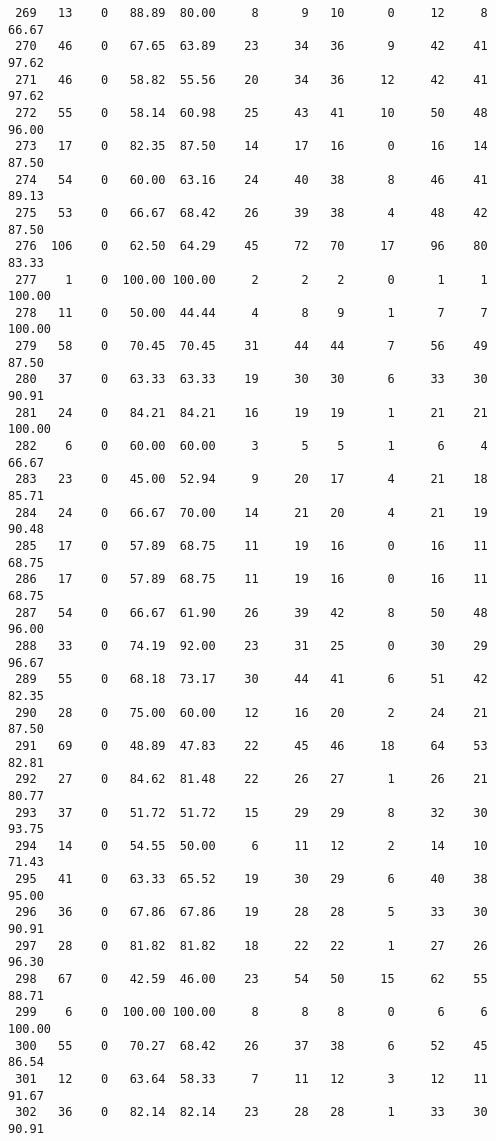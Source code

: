 \begin{verbatim}
 269   13    0   88.89  80.00     8      9   10      0     12     8    66.67
 270   46    0   67.65  63.89    23     34   36      9     42    41    97.62
 271   46    0   58.82  55.56    20     34   36     12     42    41    97.62
 272   55    0   58.14  60.98    25     43   41     10     50    48    96.00
 273   17    0   82.35  87.50    14     17   16      0     16    14    87.50
 274   54    0   60.00  63.16    24     40   38      8     46    41    89.13
 275   53    0   66.67  68.42    26     39   38      4     48    42    87.50
 276  106    0   62.50  64.29    45     72   70     17     96    80    83.33
 277    1    0  100.00 100.00     2      2    2      0      1     1   100.00
 278   11    0   50.00  44.44     4      8    9      1      7     7   100.00
 279   58    0   70.45  70.45    31     44   44      7     56    49    87.50
 280   37    0   63.33  63.33    19     30   30      6     33    30    90.91
 281   24    0   84.21  84.21    16     19   19      1     21    21   100.00
 282    6    0   60.00  60.00     3      5    5      1      6     4    66.67
 283   23    0   45.00  52.94     9     20   17      4     21    18    85.71
 284   24    0   66.67  70.00    14     21   20      4     21    19    90.48
 285   17    0   57.89  68.75    11     19   16      0     16    11    68.75
 286   17    0   57.89  68.75    11     19   16      0     16    11    68.75
 287   54    0   66.67  61.90    26     39   42      8     50    48    96.00
 288   33    0   74.19  92.00    23     31   25      0     30    29    96.67
 289   55    0   68.18  73.17    30     44   41      6     51    42    82.35
 290   28    0   75.00  60.00    12     16   20      2     24    21    87.50
 291   69    0   48.89  47.83    22     45   46     18     64    53    82.81
 292   27    0   84.62  81.48    22     26   27      1     26    21    80.77
 293   37    0   51.72  51.72    15     29   29      8     32    30    93.75
 294   14    0   54.55  50.00     6     11   12      2     14    10    71.43
 295   41    0   63.33  65.52    19     30   29      6     40    38    95.00
 296   36    0   67.86  67.86    19     28   28      5     33    30    90.91
 297   28    0   81.82  81.82    18     22   22      1     27    26    96.30
 298   67    0   42.59  46.00    23     54   50     15     62    55    88.71
 299    6    0  100.00 100.00     8      8    8      0      6     6   100.00
 300   55    0   70.27  68.42    26     37   38      6     52    45    86.54
 301   12    0   63.64  58.33     7     11   12      3     12    11    91.67
 302   36    0   82.14  82.14    23     28   28      1     33    30    90.91

\end{verbatim}
